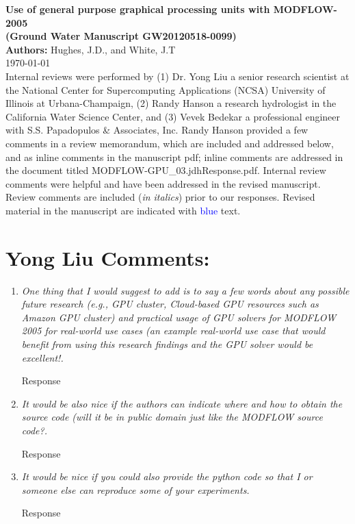 \documentclass[12pt]{article} %
\begin{document}
\noindent
\textbf{Use of general purpose graphical processing units with MODFLOW-2005 \\ (Ground Water Manuscript GW20120518-0099) }\\

\noindent
\textbf{Authors:} Hughes, J.D., and White, J.T \\

\today \\

\noindent
Internal reviews were performed by (1) Dr. Yong Liu a senior research scientist at the National Center for Supercomputing Applications (NCSA) University of Illinois at Urbana-Champaign, (2) Randy Hanson a research hydrologist in the California Water Science Center, and (3) Vevek Bedekar a professional engineer with  S.S. Papadopulos \& Associates, Inc. Randy Hanson provided a few comments in a review memorandum, which are included and addressed below, and as inline comments in the manuscript pdf; inline comments are addressed in the document titled MODFLOW-GPU\_03.jdhResponse.pdf. Internal review comments were helpful and have been addressed in the revised manuscript. Review comments are included (\textit{in italics}) prior to our responses. Revised material in the manuscript are indicated with \textcolor{blue}{blue} text.

\section*{\small{Yong Liu Comments:}}
\begin{enumerate}
\item \textit{One thing that I would suggest to add is to say a few words about any possible future research (e.g., GPU cluster, Cloud-based GPU resources such as Amazon GPU cluster) and practical usage of GPU solvers for MODFLOW 2005 for real-world use cases (an example real-world use case that would benefit from using this research findings and the GPU solver would be excellent!.}

Response

\item \textit{It would be also nice if the authors can indicate where and how to obtain the source code (will it be in public domain just like the MODFLOW source code?.}

Response

\item \textit{It would be nice if you could also provide the python code so that I or someone else can reproduce some of your experiments.}

Response

\end{enumerate}
\end{document}
